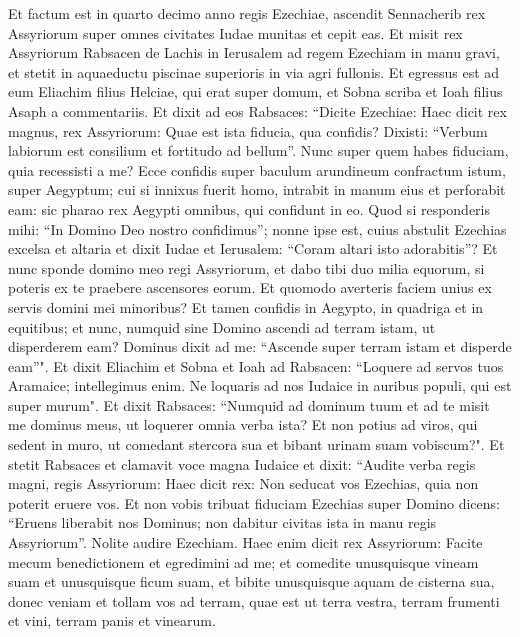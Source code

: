 \begin{biblechapter}  
\verse Et factum est in quarto decimo anno regis Ezechiae, ascendit Sennacherib rex Assyriorum super omnes civitates Iudae munitas et cepit eas. 
\verse Et misit rex Assyriorum Rabsacen de Lachis in Ierusalem ad regem Ezechiam in manu gravi, et stetit in aquaeductu piscinae superioris in via agri fullonis. 
\verse Et egressus est ad eum Eliachim filius Helciae, qui erat super domum, et Sobna scriba et Ioah filius Asaph a commentariis. 
\verse Et dixit ad eos Rabsaces: “Dicite Ezechiae: Haec dicit rex magnus, rex Assyriorum: Quae est ista fiducia, qua confidis? 
\verse Dixisti: “Verbum labiorum est consilium et fortitudo ad bellum”. Nunc super quem habes fiduciam, quia recessisti a me? 
\verse Ecce confidis super baculum arundineum confractum istum, super Aegyptum; cui si innixus fuerit homo, intrabit in manum eius et perforabit eam: sic pharao rex Aegypti omnibus, qui confidunt in eo. 
\verse Quod si responderis mihi: “In Domino Deo nostro confidimus”; nonne ipse est, cuius abstulit Ezechias excelsa et altaria et dixit Iudae et Ierusalem: “Coram altari isto adorabitis”? 
\verse Et nunc sponde domino meo regi Assyriorum, et dabo tibi duo milia equorum, si poteris ex te praebere ascensores eorum. 
\verse Et quomodo averteris faciem unius ex servis domini mei minoribus? Et tamen confidis in Aegypto, in quadriga et in equitibus; 
\verse et nunc, numquid sine Domino ascendi ad terram istam, ut disperderem eam? Dominus dixit ad me: “Ascende super terram istam et disperde eam”". 
\verse Et dixit Eliachim et Sobna et Ioah ad Rabsacen: “Loquere ad servos tuos Aramaice; intellegimus enim. Ne loquaris ad nos Iudaice in auribus populi, qui est super murum". 
\verse Et dixit Rabsaces: “Numquid ad dominum tuum et ad te misit me dominus meus, ut loquerer omnia verba ista? Et non potius ad viros, qui sedent in muro, ut comedant stercora sua et bibant urinam suam vobiscum?". 
\verse Et stetit Rabsaces et clamavit voce magna Iudaice et dixit: “Audite verba regis magni, regis Assyriorum: 
\verse Haec dicit rex: Non seducat vos Ezechias, quia non poterit eruere vos. 
\verse Et non vobis tribuat fiduciam Ezechias super Domino dicens: “Eruens liberabit nos Dominus; non dabitur civitas ista in manu regis Assyriorum”. 
\verse Nolite audire Ezechiam. Haec enim dicit rex Assyriorum: Facite mecum benedictionem et egredimini ad me; et comedite unusquisque vineam suam et unusquisque ficum suam, et bibite unusquisque aquam de cisterna sua, 
\verse donec veniam et tollam vos ad terram, quae est ut terra vestra, terram frumenti et vini, terram panis et vinearum. 

\end{biblechapter}
